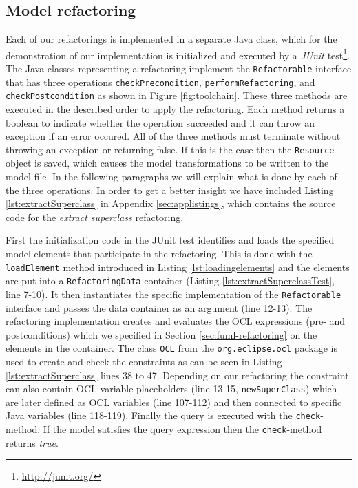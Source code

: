 \documentclass{llncs}
\begin{document}
\subsection{Model refactoring}
Each of our refactorings is implemented in a separate Java class, which for the demonstration of our implementation 
is initialized and executed by a \textit{JUnit} test\footnote{\url{http://junit.org/}}.
The Java classes representing a refactoring implement the \texttt{Refactorable}
interface that has three operations \texttt{check\-Precondition}, \texttt{perform\-Refactoring}, and \texttt{check\-Post\-condition} as 
shown in Figure \ref{fig:toolchain}. These three methods are executed in the described order to apply the refactoring. Each method
returns a boolean to indicate whether the operation succeeded and it can throw an exception if an error occured. All of the 
three methods must terminate without throwing an exception or returning false. If this is the case then the \texttt{Resource} object is 
saved, which causes the model transformations to be written to the model file. In the following paragraphs we will explain what is done 
by each of the three operations. In order to get a better insight we have
included Listing \ref{lst:extractSuperclass} in Appendix \ref{sec:applistings}, which contains the source code for the \textit{extract 
superclass} refactoring.

First the initialization code in the JUnit test identifies and loads the specified model elements that participate in the refactoring. 
This is done with the \texttt{loadElement} method introduced in Listing \ref{lst:loadingelements} and the elements are put into a 
\texttt{RefactoringData} container (Listing \ref{lst:extractSuperclassTest}, line 7-10). It then instantiates the specific implementation 
of the \texttt{Refactorable} interface and passes the data container as an argument (line 12-13). The refactoring implementation creates 
and evaluates the OCL expressions (pre- and postconditions) which we specified in Section \ref{sec:fuml-refactoring} on the elements in 
the container. The class \texttt{OCL} from the \texttt{org.\-eclipse\-.ocl} package is 
used to create and check the constraints as can be seen in Listing \ref{lst:extractSuperclass} lines 38 to 47. Depending on our 
refactoring the constraint can also contain OCL variable placeholders (line 13-15, \texttt{newSuperClass}) which are later defined as OCL 
variables (line 107-112) and then connected to specific Java variables (line 118-119). Finally the query is executed with the 
\texttt{check}-method. If the model satisfies the query expression then the \texttt{check}-method returns \textit{true}.
\end{document}
